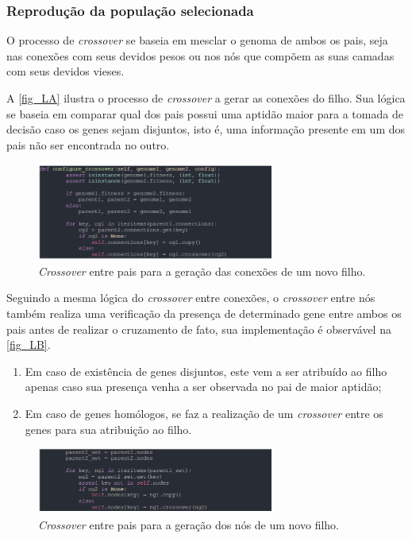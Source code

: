 \subsubsection{Reprodução da população selecionada}

O processo de \textit{crossover} se baseia em mesclar o genoma de ambos os pais,
seja nas conexões com seus devidos pesos ou nos nós que compõem as suas camadas com seus devidos vieses.

A \autoref{fig_LA} ilustra o processo de \textit{crossover} a gerar as conexões do filho.
Sua lógica se baseia em comparar qual dos pais possui uma aptidão maior para a tomada de
decisão caso os genes sejam disjuntos, isto é, uma informação presente em um dos pais não ser encontrada no outro.

\begin{figure}[htb]
        \centering
        \caption{\label{fig_LA}\textit{Crossover} entre pais para a geração das conexões de um novo filho.}
        \includegraphics[width=0.7\textwidth]{images/LA.png}
\end{figure}

Seguindo a mesma lógica do \textit{crossover} entre conexões, o \textit{crossover} entre
nós também realiza uma verificação da presença de determinado gene entre ambos os pais antes
de realizar o cruzamento de fato, sua implementação é observável na \autoref{fig_LB}.

\begin{enumerate}
	\item Em caso de existência de genes disjuntos, este vem a ser atribuído ao filho apenas caso sua presença venha a  ser observada no pai de maior aptidão;
	\item Em caso de genes homólogos, se faz a realização de um \textit{crossover} entre os genes para sua atribuição ao filho.
\end{enumerate}

\begin{figure}[htb]
        \centering
        \caption{\label{fig_LB}\textit{Crossover} entre pais para a geração dos nós de um novo filho.}
        \includegraphics[width=0.7\textwidth]{images/LB.png}
\end{figure}

